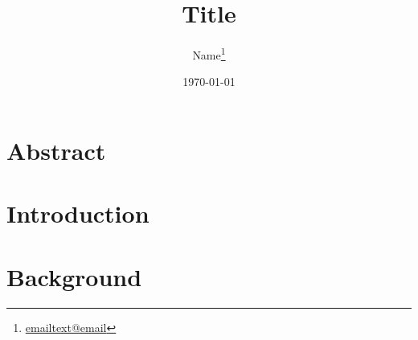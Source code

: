 \documentclass[12pt,a4paper,twoside,openright]{report}
\begin{document}
	
\listoftodos

	\title{Title}
	

	\author{Name\footnote{\href{mailto:email@email.com}{emailtext@email}}}
	
	
	

	\date{\today}


	
\pagestyle{fancy}
\fancyhf{}
\fancyhead[RE,LO]{\leftmark}%
\fancyhead[LE,RO]{\thepage}
\renewcommand{\chaptermark}[1]{\markboth{\chaptername\ \thechapter\ #1}{}}



\maketitle

\thispagestyle{empty}

\chapter*{\centering Abstract}



\thispagestyle{empty}
\chapterEnd

	
\glsunsetall
	
\tableofcontents
\chapterEnd
	
\listoffigures
\chapterEnd

\printnoidxglossaries %
\chapterEnd

\glsresetall


\chapter{Introduction\label{sc:Intro}} %

\chapterEnd

\chapter{Background\label{sc:Background}}

\chapterEnd




\chapterEnd


	
\end{document}

